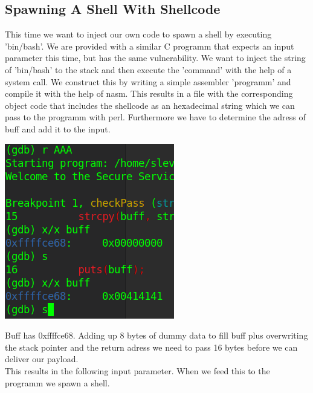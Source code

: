 \documentclass[a4paper,10pt]{article}
\begin{document}
\subsection{Spawning A Shell With Shellcode}
This time we want to inject our own code to spawn a shell by executing 'bin/bash'. We are provided with a similar C programm that expects an input parameter this time, but has the same vulnerability. We want to inject the string of 'bin/bash' to the stack and then execute the 'command' with the help of a system call.
We construct this by writing a simple assembler 'programm' and compile it with the help of nasm. This results in a file with the corresponding object code that includes the shellcode as an hexadecimal string which we can pass to the programm with perl. 
Furthermore we have to determine the adress of buff and add it to the input.
\begin{center}
 \includegraphics[scale=0.5]{breakpoint.png}
\end{center}
Buff has 0xffffce68. Adding up 8 bytes of dummy data to fill buff plus overwriting the stack pointer and the return adress we need to pass 16 bytes before we can deliver our payload.\\
This results in the following input parameter.
When we feed this to the programm we spawn a shell.


\newpage
\end{document}
